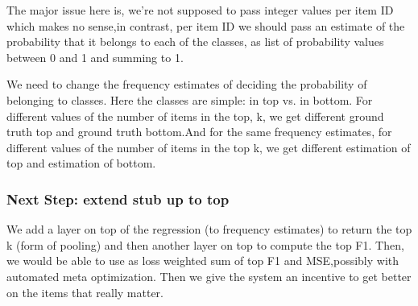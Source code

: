 The major issue here is, we’re not supposed to pass integer values per item ID which makes no sense,in contrast, per item ID we should pass an estimate of the probability that it belongs to each of the classes, as list of probability values between 0 and 1 and summing to 1.

We need to change the frequency estimates of deciding the probability of belonging to classes. Here the classes are simple: in top vs. in bottom. For different values of the number of items in the top, k, we get different ground truth top and ground truth bottom.And for the same frequency estimates, for different values of the number of items in the top k, we get different estimation of top and estimation of bottom. 



\subsubsection{Next Step: extend stub up to top}
We add a layer on top of the regression (to frequency estimates) to return the top k (form of pooling) and then another layer on top to compute the top F1.
Then, we would be able to use as loss weighted sum of top F1 and MSE,possibly with automated meta optimization. Then we give the system an incentive to get better on the items that really matter.




